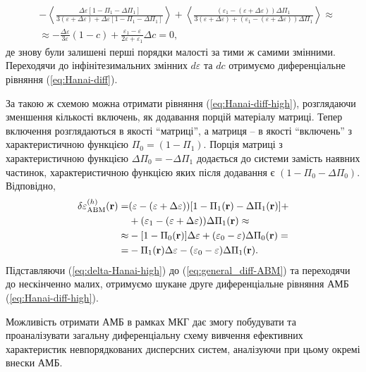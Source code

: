 \documentclass[14pt,twoside]{vakthesis}
\begin{document}
\begin{align}
&-\left\langle \frac{\Delta\varepsilon [1 - \Pi_1 - \Delta \Pi_1]}{3(\varepsilon + \Delta\varepsilon) + \Delta\varepsilon [1 - \Pi_1 - \Delta \Pi_1]} \right\rangle 
+ \left\langle \frac{(\varepsilon_1 - (\varepsilon + \Delta\varepsilon)) \Delta\Pi_1}{3(\varepsilon + \Delta\varepsilon) + (\varepsilon_1 - (\varepsilon + \Delta\varepsilon)) \Delta\Pi_1} \right\rangle \approx \nonumber\\
&\approx - \frac{\Delta\varepsilon}{3\varepsilon} (1 - c) + \frac{\varepsilon_1 - \varepsilon}{2\varepsilon + \varepsilon_1}\Delta c = 0,
\end{align}
де знову були залишені перші порядки малості за тими ж самими змінними. Переходячи до інфінітезимальних змінних $d\varepsilon$ та $dc$ отримуємо диференціальне рівняння (\ref{eq:Hanai-diff}). 

За такою ж схемою можна отримати рівняння (\ref{eq:Hanai-diff-high}), розглядаючи зменшення кількості включень, як додавання порцій матеріалу матриці. Тепер включення розглядаються в якості ``матриці'', а матриця -- в якості ``включень'' з характеристичною функцією $\Pi_0 = (1 - \Pi_1)$. Порція матриці з характеристичною функцією $\Delta\Pi_0 = - \Delta\Pi_1$ додається до системи замість наявних частинок,  характеристичною функцією яких після додавання є $(1 - \Pi_0 - \Delta\Pi_0)$. Відповідно,
\begin{equation}\label{eq:delta-Hanai-high}
\begin{split}
\delta\varepsilon_{\rm ABM}^{(h)} ({\bf r}) =& (\varepsilon - (\varepsilon + \Delta\varepsilon)) [ 1 - \Pi_1 ({\bf r}) - \Delta\Pi_1 ({\bf r})] +\\
&+ (\varepsilon_1 - (\varepsilon + \Delta\varepsilon)) \Delta\Pi_1({\bf r}) \approx \\
\approx& - [ 1 - \Pi_0 ({\bf r}) ] \Delta \varepsilon + (\varepsilon_0 - \varepsilon) \Delta\Pi_0({\bf r}) =\\
=& - \Pi_1 ({\bf r}) \Delta\varepsilon - (\varepsilon_0 - \varepsilon) \Delta\Pi_1({\bf r}).
\end{split}
\end{equation}
Підставляючи (\ref{eq:delta-Hanai-high}) до (\ref{eq:general_diff-ABM})
та переходячи до нескінченно малих, отримуємо шукане друге диференціальне рівняння АМБ (\ref{eq:Hanai-diff-high}).

Можливість отримати АМБ в рамках МКГ дає змогу побудувати та проаналізувати загальну диференціальну схему вивчення ефективних характеристик невпорядкованих дисперсних систем, аналізуючи при цьому окремі внески АМБ.
\end{document}
